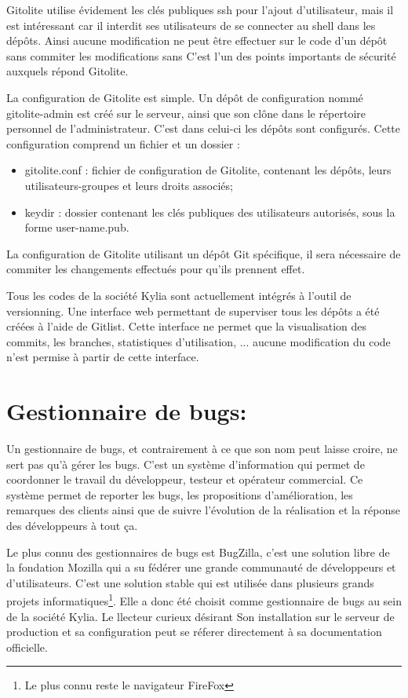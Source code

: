 \documentclass{themeensg}
\begin{document}
Gitolite utilise évidement les clés publiques ssh pour l'ajout d'utilisateur, mais il est intéressant car il interdit ses utilisateurs de se connecter au shell dans les dépôts. Ainsi aucune modification ne peut être effectuer sur le code d'un dépôt sans commiter les modifications sans C'est l'un des points importants de sécurité auxquels répond Gitolite.

 La configuration de Gitolite est simple. Un dépôt de configuration nommé gitolite-admin est créé sur le serveur, ainsi que son clône dans le répertoire personnel de l'administrateur. C'est dans celui-ci les dépôts sont configurés. Cette configuration comprend un fichier et un dossier :
\begin{itemize}
\item gitolite.conf : fichier de configuration de Gitolite, contenant les dépôts, leurs utilisateurs-groupes et leurs droits associés;
\item keydir : dossier contenant les clés publiques des utilisateurs autorisés, sous la forme user-name.pub.
\end{itemize}

La configuration de Gitolite utilisant un dépôt Git spécifique, il sera nécessaire de commiter les changements effectués pour qu'ils prennent effet.

Tous les codes de la société Kylia sont actuellement intégrés à l'outil de versionning. Une interface web permettant de superviser tous les dépôts a été créées à l'aide de Gitlist. Cette interface ne permet que la visualisation des commits, les branches, statistiques d'utilisation, ... aucune modification du code n'est permise à partir de cette interface.

\section{Gestionnaire de bugs:}
Un gestionnaire de bugs, et contrairement à ce que son nom peut laisse croire, ne sert pas qu'à gérer les bugs. C'est un système d'information qui permet de coordonner le travail du développeur, testeur et opérateur commercial. Ce système permet de reporter les bugs, les propositions d'amélioration, les remarques des clients ainsi que de suivre l'évolution de la réalisation et la réponse des développeurs à tout ça.

Le plus connu des gestionnaires de bugs est BugZilla, c'est une solution libre de la fondation Mozilla qui a su fédérer une grande communauté de développeurs et d'utilisateurs. C'est une solution stable qui est utilisée dans plusieurs grands projets informatiques\footnote{Le plus connu reste le navigateur FireFox}. Elle a donc été choisit comme gestionnaire de bugs au sein de la société Kylia. Le llecteur curieux désirant Son installation sur le serveur de production et sa configuration peut se réferer directement à sa documentation officielle.
\end{document}
